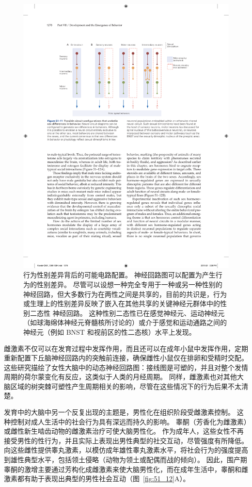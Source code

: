 \begin{figure}[htbp]
	\centering
	\includegraphics[width=0.8\linewidth]{chap51/fig_51_11}
	\caption{行为性别差异背后的可能电路配置。
		神经回路图可以配置为产生行为的性别差异。
		尽管可以设想一种完全专用于一种或另一种性别的神经回路，但大多数行为在两性之间是共享的，目前的共识是，行为或生理上的性别差异反映了嵌入在其他共享的关键神经元群体中的性别二态性 神经回路。
		这种性别二态性已在感觉神经元、运动神经元（如球海绵体神经元脊髓核所讨论的）或介于感觉和运动通路之间的神经元（例如 BNST 和视前区的性二态核）水平上发现。}
	\label{fig:51_11}
\end{figure}


雌激素不仅可以在发育过程中发挥作用，而且还可以在成年小鼠中发挥作用，定期重新配置下丘脑神经回路内的突触前连接，确保雌性小鼠仅在排卵和受精时交配。
这些研究描绘了女性大脑中的动态神经回路图：接线图是可塑的，并且对整个发情周期的荷尔蒙变化有反应，这类似于人类的月经周期。
同样，雌激素也对其他大脑区域的树突棘可塑性产生周期相关的影响，尽管在这些情况下的行为后果不太清楚。


发育中的大脑中另一个反复出现的主题是，男性化在组织阶段受雌激素控制。
这种控制对成人生活中的社会行为具有深远而持久的影响。
睾酮（芳香化为雌激素）或雌性新生啮齿动物的雌激素治疗可使大脑男性化。
作为成年人，这些女性不再接受男性的性行为，并且实际上表现出男性典型的社交互动，尽管强度有所降低。
向这些雌性提供睾丸激素，以模仿成年雄性睾丸激素水平，将社会行为的强度提高到雄性典型水平，包括领土侵略（动物为领土或配偶而战的倾向）。
因此，围产期睾酮的激增主要通过芳构化成雌激素来使大脑男性化，而在成年生活中，睾酮和雌激素都有助于表现出典型的男性社会互动（图~\ref{fig:51_12}A）。


